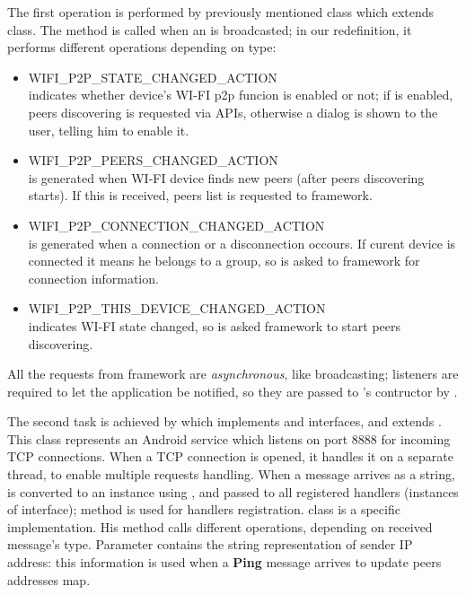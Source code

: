 	The first operation is performed by previously mentioned  class which extends  class. The method  is called when an  is broadcasted; in our redefinition, it performs different operations depending on  type:
	\begin{itemize}
		\item WIFI\_P2P\_STATE\_CHANGED\_ACTION \hfill \\
		indicates whether device's WI-FI p2p funcion is enabled or not; if is enabled, peers discovering is requested via \direct APIs, otherwise a dialog is shown to the user, telling him to enable it.
		\item WIFI\_P2P\_PEERS\_CHANGED\_ACTION \hfill \\
		is generated when WI-FI device finds new peers (after peers discovering starts). If this  is received, peers list is requested to \direct framework.
		\item WIFI\_P2P\_CONNECTION\_CHANGED\_ACTION \hfill \\
		is generated when a connection or a disconnection occours. If curent device is connected it means he belongs to a \direct group, so is asked to \direct framework for connection information.
		\item WIFI\_P2P\_THIS\_DEVICE\_CHANGED\_ACTION \hfill \\
		indicates WI-FI state changed, so is asked \direct framework to start peers discovering.		
	\end{itemize}

All the requests from \direct framework are \textit{asynchronous}, like  broadcasting; listeners are required to let the application be notified, so they are passed to 's contructor by .
	
	The second task is achieved by  which implements  and  interfaces, and extends . This class represents an Android service which listens on port 8888 for incoming TCP connections. When a TCP connection is opened, it handles it on a separate thread, to enable multiple requests handling. When a message arrives as a string, is converted to an  instance using , and passed to all registered handlers (instances of  interface);  method is used for handlers registration.
	 class is a specific  implementation. His method  calls different  operations, depending on received message's type. Parameter  contains the string representation of sender IP address: this information is used when a \textbf{Ping} message arrives to update peers addresses map.
	\\
